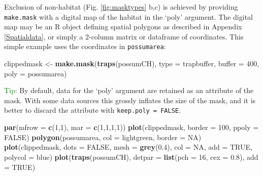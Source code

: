 \documentclass[
]{book}
\newenvironment{Shaded}{\begin{snugshade}}{\end{snugshade}}
\newcommand{\AttributeTok}[1]{\textcolor[rgb]{0.13,0.29,0.53}{#1}}
\newcommand{\ConstantTok}[1]{\textcolor[rgb]{0.56,0.35,0.01}{#1}}
\newcommand{\DecValTok}[1]{\textcolor[rgb]{0.00,0.00,0.81}{#1}}
\newcommand{\FloatTok}[1]{\textcolor[rgb]{0.00,0.00,0.81}{#1}}
\newcommand{\FunctionTok}[1]{\textcolor[rgb]{0.13,0.29,0.53}{\textbf{#1}}}
\newcommand{\NormalTok}[1]{#1}
\newcommand{\OtherTok}[1]{\textcolor[rgb]{0.56,0.35,0.01}{#1}}
\newcommand{\StringTok}[1]{\textcolor[rgb]{0.31,0.60,0.02}{#1}}
\begin{document}
Exclusion of non-habitat (Fig. \ref{fig:masktypes} b,c) is achieved by providing \texttt{make.mask} with a digital map of the habitat in the `poly' argument. The digital map may be an R object defining spatial polygons as described in Appendix \ref{Spatialdata}, or simply a 2-column matrix or dataframe of coordinates. This simple example uses the coordinates in \texttt{possumarea}:

\begin{Shaded}
\begin{Highlighting}[]
\NormalTok{clippedmask }\OtherTok{\textless{}{-}} \FunctionTok{make.mask}\NormalTok{(}\FunctionTok{traps}\NormalTok{(possumCH), }\AttributeTok{type =} \StringTok{\textquotesingle{}trapbuffer\textquotesingle{}}\NormalTok{, }\AttributeTok{buffer =} \DecValTok{400}\NormalTok{, }
                        \AttributeTok{poly =}\NormalTok{ possumarea)}
\end{Highlighting}
\end{Shaded}

\textcolor{green}{Tip:} By default, data for the `poly' argument are retained as an attribute of the mask. With some data sources this grossly inflates the size of the mask, and it is better to discard the attribute with \texttt{keep.poly\ =\ FALSE}.

\begin{Shaded}
\begin{Highlighting}[]
\FunctionTok{par}\NormalTok{(}\AttributeTok{mfrow =} \FunctionTok{c}\NormalTok{(}\DecValTok{1}\NormalTok{,}\DecValTok{1}\NormalTok{), }\AttributeTok{mar =} \FunctionTok{c}\NormalTok{(}\DecValTok{1}\NormalTok{,}\DecValTok{1}\NormalTok{,}\DecValTok{1}\NormalTok{,}\DecValTok{1}\NormalTok{))}
\FunctionTok{plot}\NormalTok{(clippedmask, }\AttributeTok{border =} \DecValTok{100}\NormalTok{, }\AttributeTok{ppoly =} \ConstantTok{FALSE}\NormalTok{)}
\FunctionTok{polygon}\NormalTok{(possumarea, }\AttributeTok{col =} \StringTok{\textquotesingle{}lightgreen\textquotesingle{}}\NormalTok{, }\AttributeTok{border =} \ConstantTok{NA}\NormalTok{)}
\FunctionTok{plot}\NormalTok{(clippedmask, }\AttributeTok{dots =} \ConstantTok{FALSE}\NormalTok{, }\AttributeTok{mesh =} \FunctionTok{grey}\NormalTok{(}\FloatTok{0.4}\NormalTok{), }\AttributeTok{col =} \ConstantTok{NA}\NormalTok{, }
    \AttributeTok{add =} \ConstantTok{TRUE}\NormalTok{, }\AttributeTok{polycol =} \StringTok{\textquotesingle{}blue\textquotesingle{}}\NormalTok{)}
\FunctionTok{plot}\NormalTok{(}\FunctionTok{traps}\NormalTok{(possumCH), }\AttributeTok{detpar =} \FunctionTok{list}\NormalTok{(}\AttributeTok{pch =} \DecValTok{16}\NormalTok{, }\AttributeTok{cex =} \FloatTok{0.8}\NormalTok{), }
    \AttributeTok{add =} \ConstantTok{TRUE}\NormalTok{)}
\end{Highlighting}
\end{Shaded}
\end{document}
